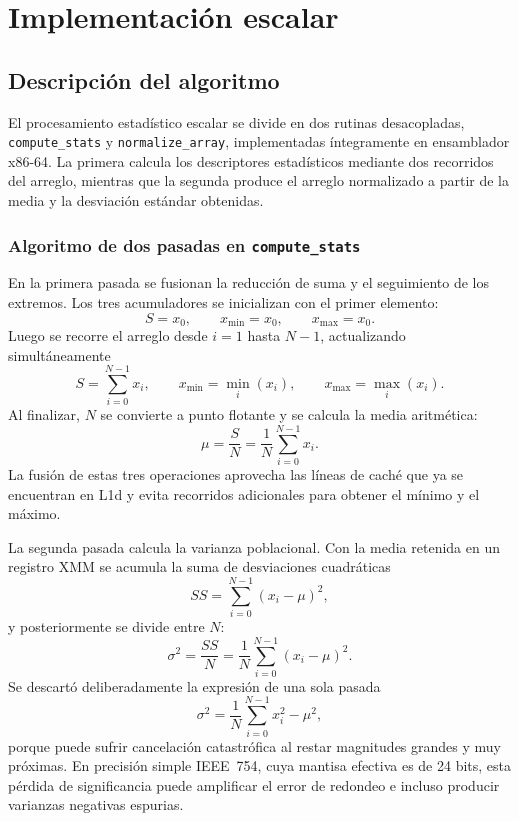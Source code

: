 \documentclass[journal]{IEEEtran}
\begin{document}
\section{Implementación escalar}

\subsection{Descripción del algoritmo}

El procesamiento estadístico escalar se divide en dos rutinas desacopladas,
\texttt{compute\_stats} y \texttt{normalize\_array}, implementadas íntegramente
en ensamblador x86-64. La primera calcula los descriptores estadísticos mediante
dos recorridos del arreglo, mientras que la segunda produce el arreglo
normalizado a partir de la media y la desviación estándar obtenidas.

\subsubsection{Algoritmo de dos pasadas en \texttt{compute\_stats}}

En la primera pasada se fusionan la reducción de suma y el seguimiento de los
extremos. Los tres acumuladores se inicializan con el primer elemento:
\begin{equation}
  S=x_0, \qquad x_{\min}=x_0, \qquad x_{\max}=x_0.
  \label{eq:scalar-init}
\end{equation}
Luego se recorre el arreglo desde $i=1$ hasta $N-1$, actualizando
simultáneamente
\begin{equation}
  S=\sum_{i=0}^{N-1}x_i, \qquad
  x_{\min}=\min_i(x_i), \qquad
  x_{\max}=\max_i(x_i).
  \label{eq:scalar-pass1}
\end{equation}
Al finalizar, $N$ se convierte a punto flotante y se calcula la media
aritmética:
\begin{equation}
  \mu=\frac{S}{N}=\frac{1}{N}\sum_{i=0}^{N-1}x_i.
  \label{eq:scalar-mean}
\end{equation}
La fusión de estas tres operaciones aprovecha las líneas de caché que ya se
encuentran en L1d y evita recorridos adicionales para obtener el mínimo y el
máximo.

La segunda pasada calcula la varianza poblacional. Con la media retenida en un
registro XMM se acumula la suma de desviaciones cuadráticas
\begin{equation}
  SS=\sum_{i=0}^{N-1}(x_i-\mu)^2,
  \label{eq:scalar-ss}
\end{equation}
y posteriormente se divide entre $N$:
\begin{equation}
  \sigma^2=\frac{SS}{N}
  =\frac{1}{N}\sum_{i=0}^{N-1}(x_i-\mu)^2.
  \label{eq:scalar-variance}
\end{equation}
Se descartó deliberadamente la expresión de una sola pasada
\begin{equation}
  \sigma^2=\frac{1}{N}\sum_{i=0}^{N-1}x_i^2-\mu^2,
  \label{eq:naive-variance}
\end{equation}
porque puede sufrir cancelación catastrófica al restar magnitudes grandes y muy
próximas. En precisión simple IEEE~754, cuya mantisa efectiva es de 24 bits,
esta pérdida de significancia puede amplificar el error de redondeo e incluso
producir varianzas negativas espurias.
\end{document}
